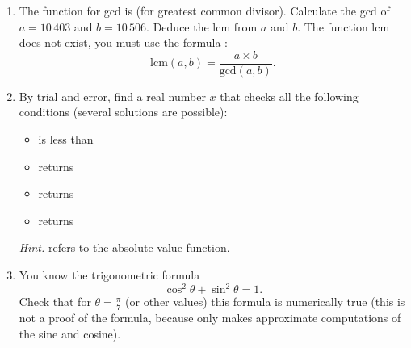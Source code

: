 \documentclass[11pt,class=report,crop=false]{standalone}
\begin{document}
\begin{activite}


\begin{enumerate}
  \item The \Python{} function for gcd is  (for greatest common divisor). Calculate the gcd of $a = 10\,403$ and $b = 10\,506$. Deduce the lcm from $a$ and $b$. The function lcm does not exist, you must use the formula :
  $$\text{lcm}(a,b) = \frac{a \times b}{\text{gcd}(a,b)}.$$
  
  \item By trial and error, find a real number $x$ that checks all the following conditions (several solutions are possible):
  \begin{itemize}
    \item {} is less than 
    \item {} returns 
    \item {} returns 
    \item {} returns  
  \end{itemize}
 
  \emph{Hint.}  refers to the absolute value function.
  
  \item You know the trigonometric formula 
  $$\cos^2 \theta + \sin^2 \theta = 1.$$
  Check that for $\theta = \frac\pi7$ (or other values) this formula is numerically true (this is not a proof of the formula, because \Python{} only makes approximate computations of the sine and cosine).
\end{enumerate}  
\end{activite}

\end{document}
